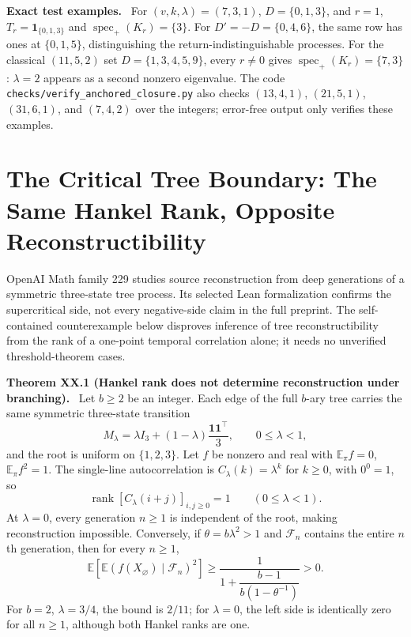 \documentclass[11pt,a4paper,oneside]{book}
\newcommand{\one}{\mathbf 1}\newcommand{\ii}{\mathrm i}\newcommand{\dd}{\mathrm d}
\DeclareMathOperator{\rank}{rank}\DeclareMathOperator{\Tr}{Tr}
\DeclareMathOperator{\spec}{spec}\DeclareMathOperator{\diag}{diag}
\newcommand{\statement}[3]{\par\medskip\noindent\textbf{#1 #2 (#3).}\ }
\newcommand{\note}[1]{\par\medskip\noindent\textbf{#1}\ }
\begin{document}
\note{Exact test examples.} For $(v,k,\lambda)=(7,3,1)$, $D=\{0,1,3\}$, and $r=1$, $T_r=\one_{\{0,1,3\}}$ and $\spec_+(K_r)=\{3\}$. For $D'=-D=\{0,4,6\}$, the same row has ones at $\{0,1,5\}$, distinguishing the return-indistinguishable processes. For the classical $(11,5,2)$ set $D=\{1,3,4,5,9\}$, every $r\ne0$ gives $\spec_+(K_r)=\{7,3\}$: $\lambda=2$ appears as a second nonzero eigenvalue. The code \texttt{checks/verify\_anchored\_closure.py} also checks $(13,4,1)$, $(21,5,1)$, $(31,6,1)$, and $(7,4,2)$ over the integers; error-free output only verifies these examples.
\chapter{The Critical Tree Boundary: The Same Hankel Rank, Opposite Reconstructibility}
OpenAI Math family 229 studies source reconstruction from deep generations of a symmetric three-state tree process. Its selected Lean formalization confirms the supercritical side, not every negative-side claim in the full preprint. The self-contained counterexample below disproves inference of tree reconstructibility from the rank of a one-point temporal correlation alone; it needs no unverified threshold-theorem cases.
\statement{Theorem}{XX.1}{Hankel rank does not determine reconstruction under branching} Let $b\ge2$ be an integer. Each edge of the full $b$-ary tree carries the same symmetric three-state transition
\[M_\lambda=\lambda I_3+(1-\lambda)\frac{\one\one^\top}{3},\qquad0\le\lambda<1,\]
and the root is uniform on $\{1,2,3\}$. Let $f$ be nonzero and real with $\mathbb E_\pi f=0$, $\mathbb E_\pi f^2=1$. The single-line autocorrelation is $C_\lambda(k)=\lambda^k$ for $k\ge0$, with $0^0=1$, so
\[\rank[C_\lambda(i+j)]_{i,j\ge0}=1\qquad(0\le\lambda<1).\]
At $\lambda=0$, every generation $n\ge1$ is independent of the root, making reconstruction impossible. Conversely, if $\theta=b\lambda^2>1$ and $\mathcal F_n$ contains the entire $n$th generation, then for every $n\ge1$,
\begin{equation}\mathbb E\left[\mathbb E(f(X_\varnothing)\mid\mathcal F_n)^2\right]\ge\frac1{1+\dfrac{b-1}{b(1-\theta^{-1})}}>0.\tag{101}\end{equation}
For $b=2$, $\lambda=3/4$, the bound is $2/11$; for $\lambda=0$, the left side is identically zero for all $n\ge1$, although both Hankel ranks are one.
\end{document}
